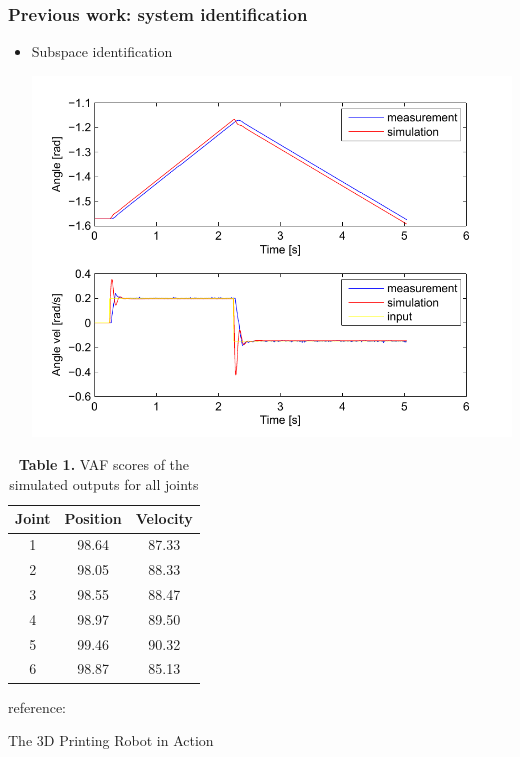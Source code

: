 \documentclass{beamer}
\begin{document}
	\begin{frame}\frametitle{Previous work: system identification}
		\begin{itemize}
			\item \fontsize{8}{4}\selectfont Subspace identification \hspace{3mm} 
				\begin{center}
					\includegraphics[width=0.5\linewidth]{images/Joint1}
				\end{center}

		\end{itemize}
		\pause
		\begin{table}
			\fontsize{7}{4}\selectfont 
			\caption{\fontsize{8}{4}\selectfont  \textbf{Table 1.} VAF scores of the simulated outputs for all joints}	
			\centering
			\begin{tabular}{|c|c|c|}
				\hline Joint & Position  & Velocity \\ 
				\hline 1 & 98.64 & 87.33 \\ 
				\hline 2 & 98.05 & 88.33 \\ 
				\hline 3 & 98.55 & 88.47 \\ 
				\hline 4 & 98.97 & 89.50 \\ 
				\hline 5 & 99.46 & 90.32 \\ 
				\hline 6 & 98.87 & 85.13 \\ 
				\hline 
			\end{tabular} 
			\label{tab:vaf}
		\end{table}
		\centering
		\fontsize{8}{4}\selectfont	reference: \citet{Gier2013}			
	\end{frame}
			
	\begin{frame}{The 3D Printing Robot in Action}
		
	\end{frame}
						
\end{document}
